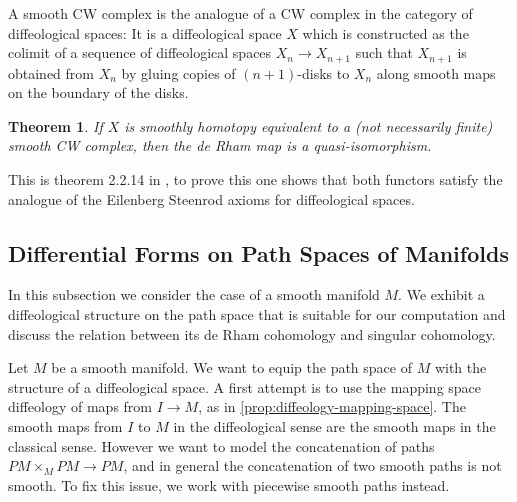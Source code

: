 \documentclass{scrartcl}
\theoremstyle{plain}
\newtheorem{theorem}{Theorem}[section]
\newtheorem{corollary}[theorem]{Corollary}
\theoremstyle{definition}
\newcommand{\injto}{\hookrightarrow}
\newcommand{\surjfrom}{\twoheadleftarrow}
\begin{document}
A smooth CW complex is the analogue of a CW complex in the category of diffeological spaces: It is a diffeological space $X$ which is constructed as the colimit of a sequence of diffeological spaces $X_n\to X_{n+1}$ such that $X_{n+1}$ is obtained from $X_n$ by gluing copies of $(n+1)$-disks to $X_n$ along smooth maps on the boundary of the disks. 
\begin{theorem}\label{thm:diffeological-de-rham-cw}
    If $X$ is smoothly homotopy equivalent to a (not necessarily finite) smooth CW complex, then the de Rham map is a quasi-isomorphism.
\end{theorem}
This is theorem 2.2.14 in \cite{gurer2014topologie}, to prove this one shows that both functors satisfy the analogue of the Eilenberg Steenrod axioms for diffeological spaces. 




\subsection{Differential Forms on Path Spaces of Manifolds}\label{subsec:diffeological-path-spaces}

In this subsection we consider the case of a smooth manifold $M$. We exhibit a diffeological structure on the path space that is suitable for our computation and discuss the relation between its de Rham cohomology and singular cohomology.

Let $M$ be a smooth manifold. We want to equip the path space of $M$ with the structure of a diffeological space. A first attempt is to use the mapping space diffeology of maps from $I\to M$, as in \cref{prop:diffeology-mapping-space}. The smooth maps from $I$ to $M$ in the diffeological sense are the smooth maps in the classical sense. However we want to model the concatenation of paths $PM\times_M PM\to PM$, and in general the concatenation of two smooth paths is not smooth. To fix this issue, we work with piecewise smooth paths instead. 
\end{document}
